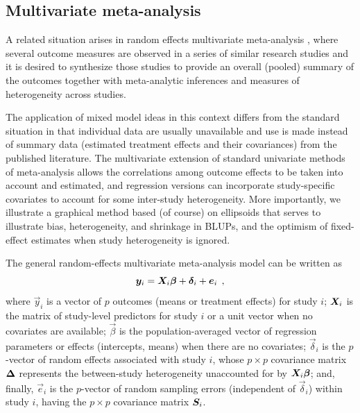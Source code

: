 \subsection{Multivariate meta-analysis}
A related situation arises in random effects multivariate
meta-analysis
\citep{Berkey-etal:1998,Nam-etal:2003},
where several outcome measures are observed in a series of
similar research studies and it is desired to synthesize
those studies to provide an overall (pooled) summary of the outcomes
together with meta-analytic inferences and
measures of heterogeneity across studies.

The application of mixed model ideas in this context differs
from the standard situation in that individual data are
usually unavailable and use is made instead of
summary data (estimated treatment effects and their covariances)
from the published literature. The multivariate extension of standard
univariate methods of meta-analysis allows the correlations among
outcome effects to be taken into account and estimated, and
regression versions can incorporate study-specific covariates to
account for some inter-study heterogeneity. More importantly,
we illustrate a graphical method based (of course) on ellipsoids
that serves to illustrate bias, heterogeneity, and shrinkage in BLUPs,
and the optimism of fixed-effect estimates when
study heterogeneity is ignored.

The general random-effects multivariate meta-analysis model can be
written as
\begin{equation}\label{eq:mvmeta1}
	\bm{y}_i = \bm{X}_i \bm{\beta} + \bm{\delta}_i + \bm{e}_i \:\: ,
\end{equation}
where $\vec{y}_i$ is a vector of $p$ outcomes (means or treatment effects)
for study $i$; $\bm{X}_i$ is the matrix of study-level predictors
for study $i$ or a unit vector when no covariates are available;
$\vec{\beta}$ is the population-averaged vector of regression parameters
or effects (intercepts, means) when there are no covariates;
$\vec{\delta}_i$ is the $p$-vector of random effects associated with study $i$,
whose $p\times p$ covariance matrix $\bm{\Delta}$ represents the between-study
heterogeneity unaccounted for by $\bm{X}_i \bm{\beta}$; and,
finally, $\vec{e}_i$ is the $p$-vector of random sampling errors
(independent of $\vec{\delta}_i$)
within study $i$, having the $p\times p$ covariance matrix $\bm{S}_i$.


